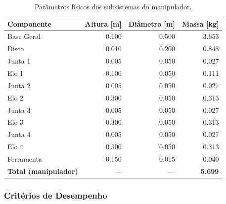 \begin{table}[ht]
\centering
\caption{Parâmetros físicos dos subsistemas do manipulador.}
\label{tab:parametros_fisicos}
\begin{tabular}{lrrr}
\toprule
Componente & Altura [m] & Diâmetro [m] & Massa [kg] \\
\midrule
Base Geral  & 0.100 & 0.500 & 3.653 \\
Disco       & 0.010 & 0.200 & 0.848 \\
Junta 1     & 0.005 & 0.050 & 0.027 \\
Elo 1       & 0.100 & 0.050 & 0.111 \\
Junta 2     & 0.005 & 0.050 & 0.027 \\
Elo 2       & 0.300 & 0.050 & 0.313 \\
Junta 3     & 0.005 & 0.050 & 0.027 \\
Elo 3       & 0.300 & 0.050 & 0.313 \\
Junta 4     & 0.005 & 0.050 & 0.027 \\
Elo 4       & 0.300 & 0.050 & 0.313 \\
Ferramenta  & 0.150 & 0.015 & 0.040 \\
\midrule
\textbf{Total (manipulador)} & --- & --- & \textbf{5.699} \\
\bottomrule
\end{tabular}
\end{table}

\subsubsection{Critérios de Desempenho}

\newpage


